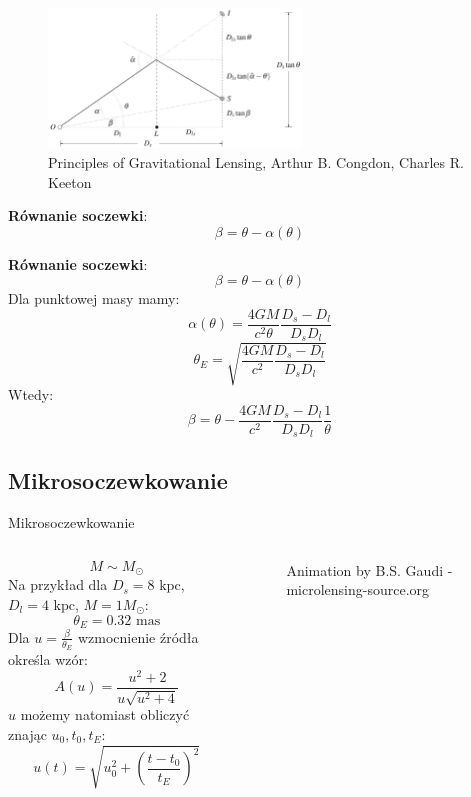 \documentclass{beamer}
\begin{document}
\begin{frame}
    \begin{figure}
        \centering
        \includegraphics[width=0.6\textwidth]{Screenshot from 2024-06-10 13-41-41.png}
        \caption*{\tiny{Principles of Gravitational
                Lensing, Arthur B. Congdon, Charles R. Keeton}}
    \end{figure}
    \textbf{Równanie soczewki}:
    \[\beta = \theta - \alpha(\theta)\]

\end{frame}

\begin{frame}
    \textbf{Równanie soczewki}:
    \[\beta = \theta - \alpha(\theta)\]
    Dla punktowej masy mamy:
    \[\alpha(\theta) = \frac{4GM}{c^2\theta}\frac{D_s-D_l}{D_s D_l}\]
    \[\theta_E = \sqrt{\frac{4GM}{c^2}\frac{D_s-D_l}{D_s D_l}}\]
    Wtedy:
    \[\beta = \theta - \frac{4GM}{c^2}\frac{D_s-D_l}{D_s D_l}\frac{1}{\theta}\]

\end{frame}

\subsection{Mikrosoczewkowanie}
\begin{frame}{Mikrosoczewkowanie}
    \begin{columns}
        \begin{column}{0.6\linewidth}
            \[M \sim M_{\odot}\]
            Na przykład dla $D_s = 8 \text{ kpc}$, $D_l = 4 \text{ kpc}$, $M = 1 M_{\odot}$:
            \[\theta_E = 0.32 \text{ mas}\]
            Dla $u = \frac{\beta}{\theta_E}$ wzmocnienie źródła określa wzór:
            \[A(u) = \frac{u^2 + 2}{u \sqrt{u^2 + 4}}\]
            $u$ możemy natomiast obliczyć znając $u_0, t_0, t_E$:
            \[u(t) = \sqrt{u_0^2 + \left(\frac{t-t_0}{t_E}\right)^2}\]
        \end{column}
        \begin{column}{0.4\linewidth}
            \begin{figure}
                \centering
                \caption*{\tiny{Animation by B.S. Gaudi - microlensing-source.org}}
            \end{figure}
        \end{column}
    \end{columns}

\end{frame}
\end{document}
